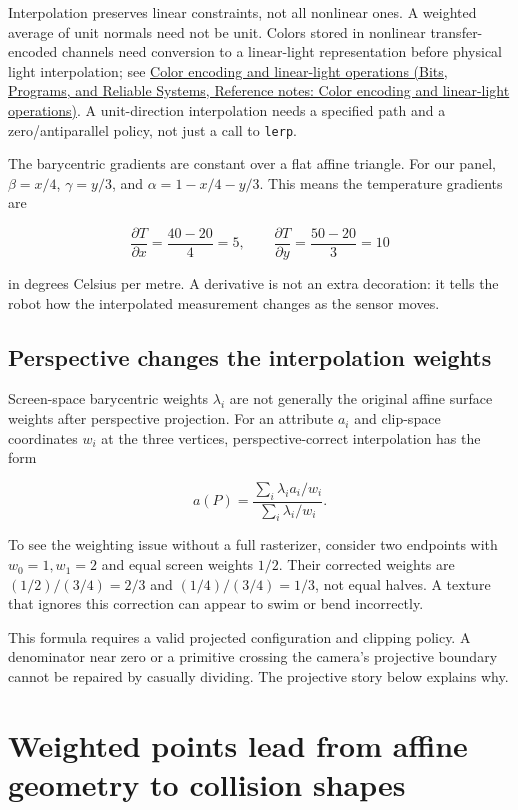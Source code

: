 Interpolation preserves linear constraints, not all nonlinear ones. A weighted average of unit normals need not be unit. Colors stored in nonlinear transfer-encoded channels need conversion to a linear-light representation before physical light interpolation; see \href{../01-Bits-Programs-and-Reliable-Systems/main.pdf\#nameddest=appendix-a9f83ad40792}{Color encoding and linear-light operations (Bits, Programs, and Reliable Systems, Reference notes: Color encoding and linear-light operations)}. A unit-direction interpolation needs a specified path and a zero/antiparallel policy, not just a call to \texttt{lerp}.

The barycentric gradients are constant over a flat affine triangle. For our panel, \(\beta=x/4\), \(\gamma=y/3\), and \(\alpha=1-x/4-y/3\). This means the temperature gradients are

\[
\frac{\partial T}{\partial x}=\frac{40-20}{4}=5,
\qquad
\frac{\partial T}{\partial y}=\frac{50-20}{3}=10
\]

in degrees Celsius per metre. A derivative is not an extra decoration: it tells the robot how the interpolated measurement changes as the sensor moves.

\subsection{Perspective changes the interpolation weights}\label{01-foundations-i-ch018-perspective-changes-the-interpolation-weights}

Screen-space barycentric weights \(\lambda_i\) are not generally the original affine surface weights after perspective projection. For an attribute \(a_i\) and clip-space coordinates \(w_i\) at the three vertices, perspective-correct interpolation has the form

\[
a(P)=\frac{\sum_i\lambda_i a_i/w_i}{\sum_i\lambda_i/w_i}.
\]

To see the weighting issue without a full rasterizer, consider two endpoints with \(w_0=1,w_1=2\) and equal screen weights \(1/2\). Their corrected weights are \((1/2)/(3/4)=2/3\) and \((1/4)/(3/4)=1/3\), not equal halves. A texture that ignores this correction can appear to swim or bend incorrectly.

This formula requires a valid projected configuration and clipping policy. A denominator near zero or a primitive crossing the camera's projective boundary cannot be repaired by casually dividing. The projective story below explains why.

\section{Weighted points lead from affine geometry to collision shapes}\label{01-foundations-i-ch018-weighted-points-lead-from-affine-geometry-to-collision-shapes}

